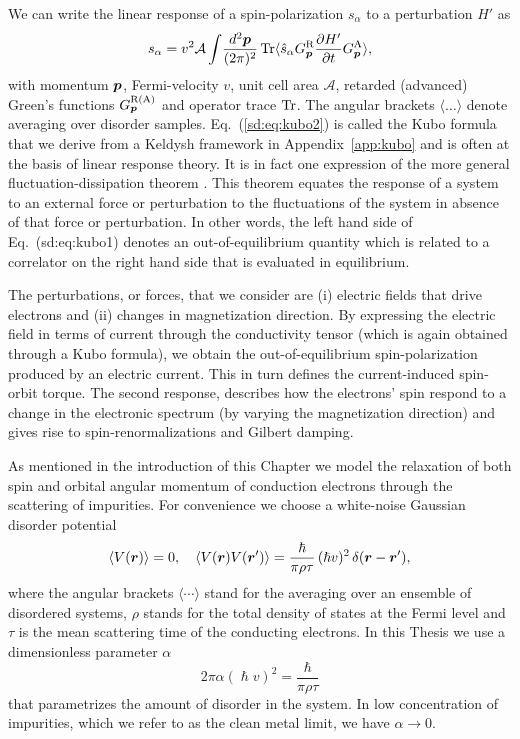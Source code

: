 We can write the linear response of a spin-polarization $s_\alpha$ to a perturbation $H'$ as
\begin{equation}
	s_\alpha = v^2\mathcal{A}\int\!\frac{d^2\boldsymbol{p}}{(2\pi)^2}\operatorname{Tr} \langle \hat{s}_\alpha G^\text{R}_{\boldsymbol{p}} \frac{\partial H'}{\partial t} G^\text{A}_{\boldsymbol{p}}\rangle,
\label{sd:eq:kubo2}
\end{equation}
with momentum $\boldsymbol{p}$, Fermi-velocity $v$, unit cell area $\mathcal{A}$, retarded (advanced) Green's functions $G^\text{R(A)}_{\boldsymbol{p}}$ and operator trace $\operatorname{Tr}$. The angular brackets $\langle\dots\rangle$ denote averaging over disorder samples. Eq.~(\ref{sd:eq:kubo2}) is called the Kubo formula that we derive from a Keldysh framework in Appendix~\ref{app:kubo} and is often at the basis of linear response theory. It is in fact one expression of the more general fluctuation-dissipation theorem \cite{Kubo_1966}. This theorem equates the response of a system to an external force or perturbation to the fluctuations of the system in absence of that force or perturbation. In other words, the left hand side of Eq.~(sd:eq:kubo1) denotes an out-of-equilibrium quantity which is related to a correlator on the right hand side that is evaluated in equilibrium. 

The perturbations, or forces, that we consider are (i) electric fields that drive electrons and (ii) changes in magnetization direction. By expressing the electric field in terms of current through the conductivity tensor (which is again obtained through a Kubo formula), we obtain the out-of-equilibrium spin-polarization produced by an electric current. This in turn defines the current-induced spin-orbit torque. The second response, describes how the electrons' spin respond to a change in the electronic spectrum (by varying the magnetization direction) and gives rise to spin-renormalizations and Gilbert damping. 

As mentioned in the introduction of this Chapter we model the relaxation of both spin and orbital angular momentum of conduction electrons through the scattering of impurities. For convenience we choose a white-noise Gaussian disorder potential
\begin{equation}
    \label{disorder}
\langle V(\boldsymbol{r})\rangle =0,\quad \langle V(\boldsymbol{r}) V(\boldsymbol{r}') \rangle = \frac{\hbar}{\pi\rho\tau}\, (\hslash v)^2\,\delta(\boldsymbol{r}-\boldsymbol{r}'),
\end{equation}
where the angular brackets $\langle\cdots\rangle$ stand for the averaging over an ensemble of disordered systems, $\rho$ stands for the total density of states at the Fermi level and $\tau$ is the mean scattering time of the conducting electrons. In this Thesis we use a dimensionless parameter $\alpha$
\begin{equation}
     2 \pi\alpha (\hslash v)^2 = \frac{\hbar}{\pi\rho\tau}
\end{equation}
that parametrizes the amount of disorder in the system. In low concentration of impurities, which we refer to as the clean metal limit, we have $\alpha\rightarrow0$. 

